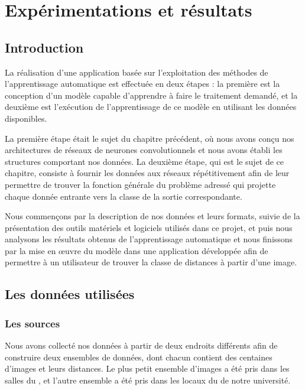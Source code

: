 \chapter{Expérimentations et résultats}

\section{Introduction}

La réalisation d'une application basée sur l'exploitation des méthodes de
l'apprentissage automatique est effectuée en deux étapes : la première est
la conception d'un modèle capable d'apprendre à faire le traitement demandé, et
la deuxième est l'exécution de l'apprentissage de ce modèle en utilisant
les données disponibles.

La première étape était le sujet du chapitre précédent, où nous avons conçu nos
architectures de réseaux de neurones convolutionnels et nous avons établi les
structures comportant nos données. La deuxième étape, qui est le sujet de ce chapitre,
consiste à fournir les données aux réseaux répétitivement afin de leur permettre
de trouver la fonction générale du problème adressé qui projette chaque donnée
entrante vers la classe de la sortie correspondante.

Nous commençons par la description de nos données et leurs formats, suivie de
la présentation des outils matériels et logiciels utilisés dans ce projet, et puis
nous analysons les résultats obtenus de l'apprentissage automatique et nous
finissons par la mise en œuvre du modèle dans une application développée
afin de permettre à un utilisateur de trouver la classe de distances à partir d'une
image.

\section{Les données utilisées}

\subsection{Les sources}

Nous avons collecté nos données à partir de deux endroits différents afin de
construire deux ensembles de données, dont chacun contient des centaines d'images
et leurs distances. Le plus petit ensemble d'images a été
pris dans les salles du ,
et l'autre ensemble a été pris dans les locaux du  de
notre université.

